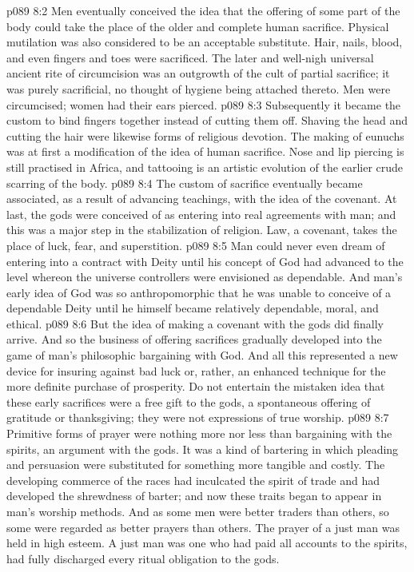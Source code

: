 \vs p089 8:2 Men eventually conceived the idea that the offering of some part of the body could take the place of the older and complete human sacrifice. Physical mutilation was also considered to be an acceptable substitute. Hair, nails, blood, and even fingers and toes were sacrificed. The later and well\hyp{}nigh universal ancient rite of circumcision was an outgrowth of the cult of partial sacrifice; it was purely sacrificial, no thought of hygiene being attached thereto. Men were circumcised; women had their ears pierced.
\vs p089 8:3 Subsequently it became the custom to bind fingers together instead of cutting them off. Shaving the head and cutting the hair were likewise forms of religious devotion. The making of eunuchs was at first a modification of the idea of human sacrifice. Nose and lip piercing is still practised in Africa, and tattooing is an artistic evolution of the earlier crude scarring of the body.
\vs p089 8:4 \pc The custom of sacrifice eventually became associated, as a result of advancing teachings, with the idea of the covenant. At last, the gods were conceived of as entering into real agreements with man; and this was a major step in the stabilization of religion. Law, a covenant, takes the place of luck, fear, and superstition.
\vs p089 8:5 Man could never even dream of entering into a contract with Deity until his concept of God had advanced to the level whereon the universe controllers were envisioned as dependable. And man’s early idea of God was so anthropomorphic that he was unable to conceive of a dependable Deity until he himself became relatively dependable, moral, and ethical.
\vs p089 8:6 But the idea of making a covenant with the gods did finally arrive.  And so the business of offering sacrifices gradually developed into the game of man’s philosophic bargaining with God. And all this represented a new device for insuring against bad luck or, rather, an enhanced technique for the more definite purchase of prosperity. Do not entertain the mistaken idea that these early sacrifices were a free gift to the gods, a spontaneous offering of gratitude or thanksgiving; they were not expressions of true worship.
\vs p089 8:7 \pc Primitive forms of prayer were nothing more nor less than bargaining with the spirits, an argument with the gods. It was a kind of bartering in which pleading and persuasion were substituted for something more tangible and costly. The developing commerce of the races had inculcated the spirit of trade and had developed the shrewdness of barter; and now these traits began to appear in man’s worship methods. And as some men were better traders than others, so some were regarded as better prayers than others. The prayer of a just man was held in high esteem. A just man was one who had paid all accounts to the spirits, had fully discharged every ritual obligation to the gods.
